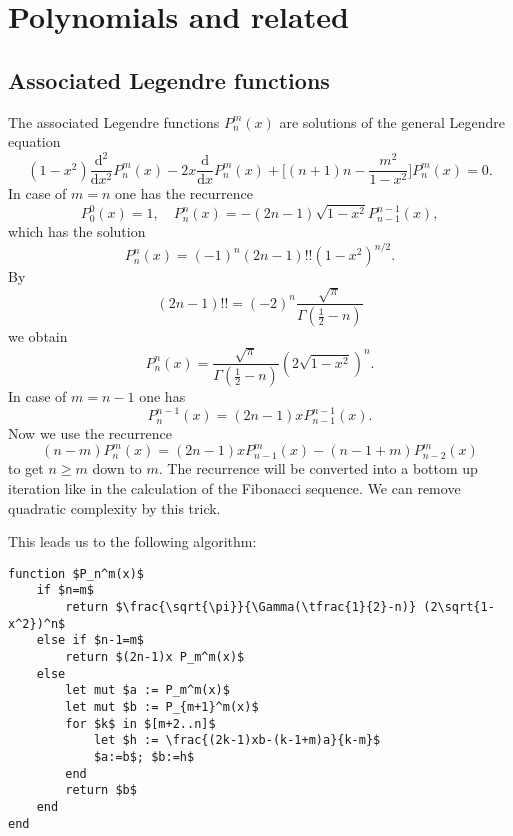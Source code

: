 \documentclass[a4paper,10pt,fleqn]{scrartcl}
\begin{document}
\newpage
\section{Polynomials and related}
\subsection{Associated Legendre functions}

The associated Legendre functions $P_n^m(x)$ are solutions
of the general Legendre equation%
\begin{equation}
(1-x^2) \frac{\mathrm d^2}{\mathrm dx^2} P_n^m(x)
- 2x \frac{\mathrm d}{\mathrm dx} P_n^m(x)
+ \bigg[(n+1)n-\frac{m^2}{1-x^2}\bigg] P_n^m(x)=0.
\end{equation}
In case of $m=n$ one has the recurrence
\begin{equation}
P_0^0(x)=1, \quad P_n^n(x) = -(2n-1)\sqrt{1-x^2}P_{n-1}^{n-1}(x),
\end{equation}
which has the solution
\begin{equation}
P_n^n(x) = (-1)^n (2n-1)!! (1-x^2)^{n/2}.
\end{equation}
By
\begin{equation}
(2n-1)!! = (-2)^n \frac{\sqrt{\pi}}{\Gamma(\tfrac{1}{2}-n)}
\end{equation}
we obtain
\begin{equation}
P_n^n(x) = \frac{\sqrt{\pi}}{\Gamma(\tfrac{1}{2}-n)} (2\sqrt{1-x^2})^n.
\end{equation}
In case of $m=n-1$ one has
\begin{equation}
P_n^{n-1}(x) = (2n-1)xP_{n-1}^{n-1}(x).
\end{equation}
Now we use the recurrence
\begin{equation}
(n-m) P_n^m(x) = (2n-1)xP_{n-1}^m(x)-(n-1+m)P_{n-2}^m(x)
\end{equation}
to get $n\ge m$ down to $m$. The recurrence will be
converted into a bottom up iteration like in the calculation of the Fibonacci
sequence. We can remove quadratic complexity by this trick.

This leads us to the following algorithm:
\begin{lstlisting}[mathescape=true]
function $P_n^m(x)$
    if $n=m$
        return $\frac{\sqrt{\pi}}{\Gamma(\tfrac{1}{2}-n)} (2\sqrt{1-x^2})^n$
    else if $n-1=m$
        return $(2n-1)x P_m^m(x)$
    else
        let mut $a := P_m^m(x)$
        let mut $b := P_{m+1}^m(x)$
        for $k$ in $[m+2..n]$
            let $h := \frac{(2k-1)xb-(k-1+m)a}{k-m}$
            $a:=b$; $b:=h$
        end
        return $b$
    end
end
\end{lstlisting}
\end{document}
